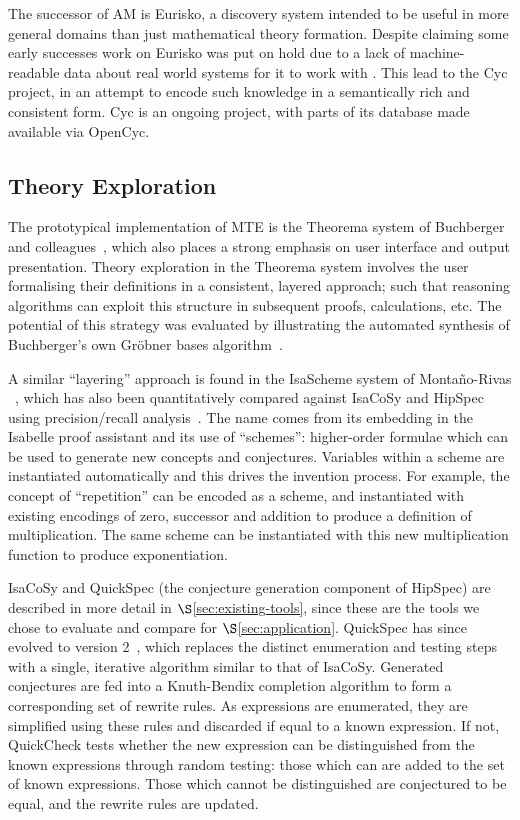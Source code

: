The successor of AM is Eurisko, a discovery system intended to be useful in more
general domains than just mathematical theory formation. Despite claiming some
early successes %
work on Eurisko was put on hold due to a lack of machine-readable data about
real world systems for it to work with %
. This lead to the Cyc project, in an attempt to encode such knowledge in a
semantically rich and consistent form. Cyc is an ongoing project, with parts of
its database made available via OpenCyc.

\subsection{Theory Exploration}

The prototypical implementation of MTE is the Theorema system of Buchberger and
colleagues~\cite{buchberger,buchberger2016theorema}, which also places a strong
emphasis on user interface and output presentation. Theory exploration in the
Theorema system involves the user formalising their definitions in a consistent,
layered approach; such that reasoning algorithms can exploit this structure in
subsequent proofs, calculations, etc. The potential of this strategy was
evaluated by illustrating the automated synthesis of Buchberger's own Gr\"obner
bases algorithm~\cite{buchberger:04}.

A similar ``layering'' approach is found in the IsaScheme system of
Monta{\~n}o-Rivas \etal{}~\cite{Montano-Rivas.McCasland.Dixon.ea:2012}, which
has also been quantitatively compared against IsaCoSy and HipSpec using
precision/recall analysis~\cite{claessen2013automating}. The name comes from its
embedding in the Isabelle proof assistant and its use of ``schemes'':
higher-order formulae which can be used to generate new concepts and
conjectures. Variables within a scheme are instantiated automatically and this
drives the invention process. For example, the concept of ``repetition'' can be
encoded as a scheme, and instantiated with existing encodings of zero, successor
and addition to produce a definition of multiplication. The same scheme can be
instantiated with this new multiplication function to produce exponentiation.

IsaCoSy and QuickSpec (the conjecture generation component of HipSpec) are
described in more detail in $\S$\ref{sec:existing-tools}, since these are the
tools we chose to evaluate and compare for $\S$\ref{sec:application}. QuickSpec
has since evolved to version 2~\cite{smallbone2017quick}, which replaces the
distinct enumeration and testing steps with a single, iterative algorithm
similar to that of IsaCoSy. Generated conjectures are fed into a Knuth-Bendix
completion algorithm to form a corresponding set of rewrite rules. As
expressions are enumerated, they are simplified using these rules and discarded
if equal to a known expression. If not, QuickCheck tests whether the new
expression can be distinguished from the known expressions through random
testing: those which can are added to the set of known expressions. Those which
cannot be distinguished are conjectured to be equal, and the rewrite rules are
updated.


